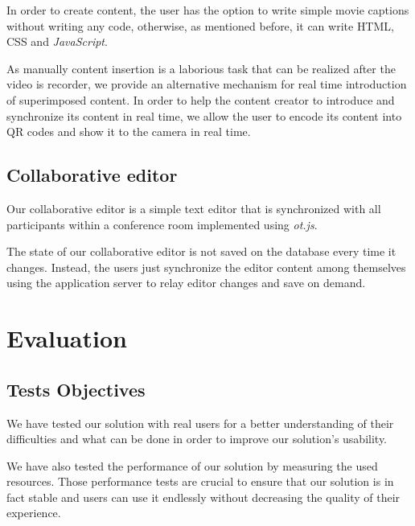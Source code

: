 \documentclass[10pt,conference]{IEEEtran}
\begin{document}
	In order to create content, the user has the option to write simple movie captions without writing any code, otherwise, as mentioned before, it can write \gls{HTML}, \gls{CSS} and \emph{JavaScript}.

	As manually content insertion is a laborious task that can be realized after the video is recorder, we provide an alternative mechanism for real time introduction of superimposed content.	In order to help the content creator to introduce and synchronize its content in real time, we allow the user to encode its content into \gls{QR} codes and show it to the camera in real time.


\subsection{Collaborative editor}

Our collaborative editor is a simple text editor that is synchronized with all participants within a conference room implemented using \emph{ot.js}.

The state of our collaborative editor is not saved on the database every time it changes. Instead, the users just synchronize the editor content among themselves using the application server to relay editor changes and save on demand.



















\section{Evaluation}
\label{chapter:evaluation}

\subsection{Tests Objectives}

  We have tested our solution with real users for a better understanding of their difficulties and what can be done in order to improve our solution's usability.

  We have also tested the performance of our solution by measuring the used resources. Those performance tests are crucial to ensure that our solution is in fact stable and users can use it endlessly without decreasing the quality of their experience. 
\end{document}
